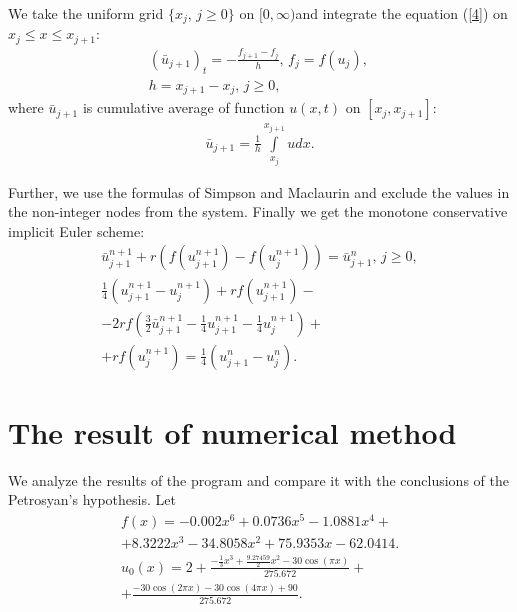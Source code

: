 \documentclass[journal]{IEEEtran}
\begin{document}
We take the uniform grid $\{x_j,\, j\geq0\}$ on $[0,\infty)$and integrate the equation (\ref{4}) on $x_j\leq x\leq x_{j+1}$:
\begin{gather*}\label{5}
(\bar{u}_{j+1})_t = -\frac{f_{j+1}-f_j}{h}, \, f_j = f(u_j),\, \\
h = x_{j+1}-x_j,\, j\geq 0,
\end{gather*}
where $\bar{u}_{j+1}$ is cumulative average of function $u(x,t)$ on $[x_j,x_{j+1}]$:
\begin{gather}\label{8}
\bar{u}_{j+1} = \frac{1}{h}\int\limits_{x_j}^{x_{j+1}}u dx.
\end{gather}

Further, we use the formulas of Simpson and Maclaurin and exclude  the values in the non-integer nodes from the system. Finally we get the monotone conservative implicit Euler scheme:
\begin{gather*}\label{11}
\bar{u}_{j+1}^{n+1}+r(f(u_{j+1}^{n+1})-f(u_j^{n+1})) = \bar{u}_{j+1}^n,\, j\geq 0,\\
\frac{1}{4}(u_{j+1}^{n+1}-u_j^{n+1})+rf(u_{j+1}^{n+1})-\\
-2rf\left(\frac{3}{2}\bar{u}_{j+1}^{n+1}-\frac{1}{4}u_{j+1}^{n+1}-\frac{1}{4}u_{j}^{n+1}\right)+
\\+rf(u_j^{n+1}) = \frac{1}{4}(u_{j+1}^n-u_{j}^{n}).\label{12}
\end{gather*}

\section{The result of numerical method}
We analyze the results of the program and compare it with the conclusions of the Petrosyan's hypothesis.
Let 
\begin{gather*}
f(x) = -0.002 x^6+0.0736x^5- 1.0881x^4+\\ 
+8.3222x^3 -34.8058x^2+ 75.9353x-62.0414. \\
u_0(x) = 2+\frac{-\tfrac{1}{3}x^3+\tfrac{9.27459}{2}x^2-30\cos(\pi x)}{275.672}+\\
+\frac{-30\cos(2\pi x)-30\cos(4\pi x)+90}{275.672}.
\end{gather*}
\end{document}
